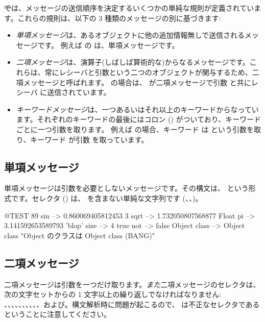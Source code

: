 \documentclass[a4paper,10pt,twoside]{book}
\begin{document}
\st では、メッセージの送信順序を決定するいくつかの単純な規則が定義されています。これらの規則は、以下の 3 種類のメッセージの別に基づきます:
\begin{itemize}
\item \emph{単項メッセージ}は、あるオブジェクトに他の追加情報無しで送信されるメッセージです。 例えば  の  は、単項メッセージです。
\item  \emph{二項メッセージ}は、演算子(しばしば算術的な)からなるメッセージです。これらは、常にレシーバと引数という二つのオブジェクトが関与するため、二項メッセージと呼ばれます。 の場合は、\ct{+} が二項メッセージで引数  と共にレシーバ  に送信されています。
\item  \emph{キーワードメッセージ}は、一つあるいはそれ以上のキーワードからなっています。それぞれのキーワードの最後にはコロン (\ct{:}) がついており、キーワードごとに一つ引数を取ります。
例えば  の場合、キーワード  は  という引数を取り、キーワード  が引数  を取っています。
\end{itemize}

\subsection{単項メッセージ}
単項メッセージは引数を必要としないメッセージです。その構文は、 という形式です。セレクタ () は、\ct{:} を含まない単純な文字列です (\eg {}、、)。
\begin{code}{@TEST}
89 sin           --> 0.860069405812453
3 sqrt           --> 1.732050807568877
Float pi         --> 3.141592653589793
'blop' size     --> 4
true not        --> false
Object class --> Object class  "Object のクラスは Object class (BANG)"
\end{code}


\subsection{二項メッセージ} 
二項メッセージは引数を一つだけ取ります。\emph{また}二項メッセージのセレクタは、次の文字セットからの 1 文字以上の繰り返しでなければなりません: \ct{+}、\ct{-}、\ct{*}、\ct{/}、\ct{\&}、\ct{=}、\ct{>}、\ct{|}、\ct{<}、\ct{\~}、および。構文解析時に問題が起こるので、\ct{--} は不正なセレクタであるということに注意してください。
\end{document}

